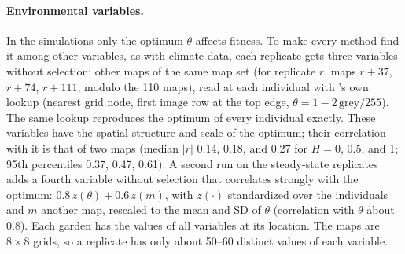 \paragraph{Environmental variables.} In the simulations only the optimum
$\theta$ affects fitness. To make every method find it among other
variables, as with climate data, each replicate gets three variables
without selection: other maps of the same map set (for replicate $r$, maps
$r+37$, $r+74$, $r+111$, modulo the 110 maps), read at each individual
with \slim's own lookup (nearest grid node, first image row at the top
edge, $\theta = 1 - 2\,\mathrm{grey}/255$). The same lookup reproduces the
optimum of every individual exactly. These variables have the spatial
structure and scale of the optimum; their correlation with it is that of
two maps (median $|r|$ 0.14, 0.18, and 0.27 for $H = 0$, 0.5, and 1; 95th
percentiles 0.37, 0.47, 0.61). A second run on the steady-state replicates
adds a fourth variable without selection that correlates strongly with the
optimum: $0.8\, z(\theta) + 0.6\, z(m)$, with $z(\cdot)$ standardized over
the individuals and $m$ another map, rescaled to the mean and SD of
$\theta$ (correlation with $\theta$ about 0.8). Each garden has the values
of all variables at its location. The maps are $8\times8$ grids, so a
replicate has only about 50--60 distinct values of each variable.

